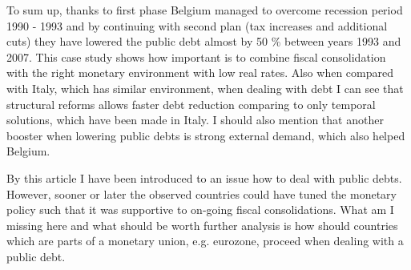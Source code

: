 To sum up, thanks to first phase Belgium managed to overcome recession period 1990 - 1993 and by continuing with second plan (tax increases and additional cuts) they have lowered the public debt almost by 50 \% between years 1993 and 2007. This case study shows how important is to combine fiscal consolidation with the right monetary environment with low real rates. Also when compared with Italy, which has similar environment, when dealing with debt I can see that structural reforms allows faster debt reduction comparing to only temporal solutions, which have been made in Italy. I should also mention that another booster when lowering public debts is strong external demand, which also helped Belgium.

By this article I have been introduced to an issue how to deal with public debts. However, sooner or later the observed countries could have tuned the monetary policy such that it was supportive to on-going fiscal consolidations. What am I missing here and what should be worth further analysis is how should countries which are parts of a monetary union, e.g. eurozone, proceed when dealing with a public debt. 